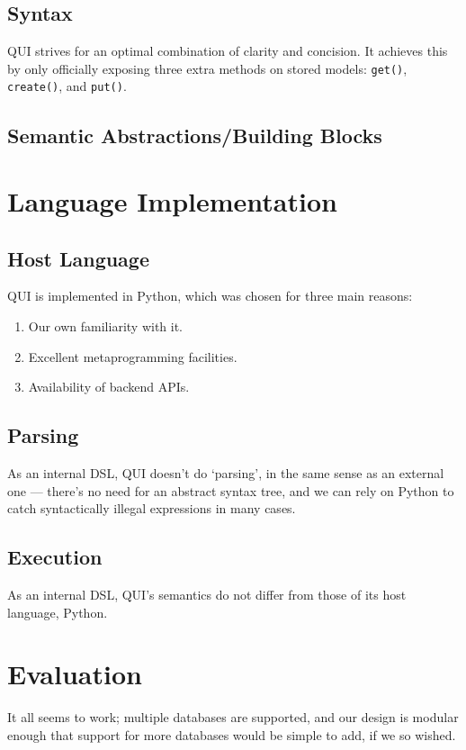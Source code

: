 \documentclass{article} %
\newcommand{\il}[1]{\lstinline{#1}}
\begin{document}
\subsection{Syntax}
QUI strives for an optimal combination of clarity and concision. It achieves this by only officially exposing three extra methods on stored models: \il{get()}, \il{create()}, and \il{put()}.
\subsection{Semantic Abstractions/Building Blocks}

\section{Language Implementation}
\subsection{Host Language}
QUI is implemented in Python, which was chosen for three main reasons:
\begin{enumerate}
\item Our own familiarity with it.
\item Excellent metaprogramming facilities.
\item Availability of backend APIs.
\end{enumerate}
\subsection{Parsing}
As an internal DSL, QUI doesn't do `parsing', in the same sense as an external one --- there's no need for an abstract syntax tree, and we can rely on Python to catch syntactically 
illegal expressions in many cases.
\subsection{Execution}
As an internal DSL, QUI's semantics do not differ from those of its host language, Python. 
\section{Evaluation}
It all seems to work; multiple databases are supported, and our design is modular enough that support for more databases would be simple to add, if we so wished. 
\end{document}
